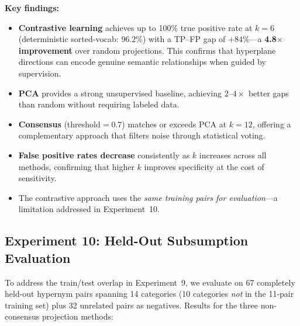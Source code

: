 \documentclass[10pt]{article}
\begin{document}
\noindent\textbf{Key findings:}
\begin{itemize}[nosep, leftmargin=*]
    \item \textbf{Contrastive learning} achieves up to 100\% true positive rate at $k\!=\!6$ (deterministic sorted-vocab: $96.2\%$) with a TP--FP gap of $+84\%$---a \textbf{4.8$\times$ improvement} over random projections. This confirms that hyperplane directions can encode genuine semantic relationships when guided by supervision.
    \item \textbf{PCA} provides a strong unsupervised baseline, achieving $2$--$4\times$ better gaps than random without requiring labeled data.
    \item \textbf{Consensus} (threshold$=0.7$) matches or exceeds PCA at $k\!=\!12$, offering a complementary approach that filters noise through statistical voting.
    \item \textbf{False positive rates decrease} consistently as $k$ increases across all methods, confirming that higher $k$ improves specificity at the cost of sensitivity.
    \item The contrastive approach uses the \emph{same training pairs for evaluation}---a limitation addressed in Experiment~10.
\end{itemize}

\subsection{Experiment 10: Held-Out Subsumption Evaluation}

To address the train/test overlap in Experiment~9, we evaluate on 67 completely held-out hypernym pairs spanning 14 categories (10 categories \emph{not} in the 11-pair training set) plus 32 unrelated pairs as negatives. Results for the three non-consensus projection methods:
\end{document}
